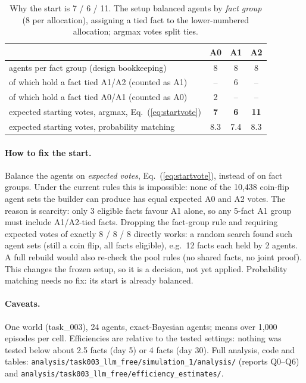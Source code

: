 \documentclass[10pt,a4paper]{article}
\begin{document}
\begin{table}[H]
\centering\small
\caption{Why the start is 7 / 6 / 11. The setup balanced agents by \emph{fact group}
(8 per allocation), assigning a tied fact to the lower-numbered allocation; argmax votes
split ties.}
\label{tab:start}
\begin{tabular}{lccc}
\toprule
 & A0 & A1 & A2 \\
\midrule
agents per fact group (design bookkeeping) & 8 & 8 & 8 \\
\quad of which hold a fact tied A1/A2 (counted as A1) & -- & 6 & -- \\
\quad of which hold a fact tied A0/A1 (counted as A0) & 2 & -- & -- \\
expected starting votes, argmax, Eq.~(\ref{eq:startvote}) & \textbf{7} & \textbf{6} & \textbf{11} \\
expected starting votes, probability matching & 8.3 & 7.4 & 8.3 \\
\bottomrule
\end{tabular}
\end{table}

\paragraph{How to fix the start.} Balance the agents on \emph{expected votes},
Eq.~(\ref{eq:startvote}), instead of on fact groups. Under the current rules this is
impossible: none of the 10,438 coin-flip agent sets the builder can produce has equal
expected A0 and A2 votes. The reason is scarcity: only 3 eligible facts favour A1
alone, so any 5-fact A1 group must include A1/A2-tied facts. Dropping the
fact-group rule and requiring expected votes of exactly 8 / 8 / 8 directly works: a
random search found such agent sets (still a coin flip, all facts eligible), e.g.\ 12
facts each held by 2 agents. A full rebuild would also re-check the pool rules (no
shared facts, no joint proof). This changes the frozen setup, so it is a decision, not
yet applied. Probability matching needs no fix: its start is already balanced.

\paragraph{Caveats.} One world (task\_003), 24 agents, exact-Bayesian agents; means over
1,000 episodes per cell. Efficiencies are relative to the tested settings: nothing was tested below
about 2.5 facts (day 5) or 4 facts (day 30). Full analysis, code and tables:
\texttt{analysis/task003\_llm\_free/simulation\_1/analysis/} (reports Q0--Q6) and
\texttt{analysis/task003\_llm\_free/efficiency\_estimates/}.
\end{document}
